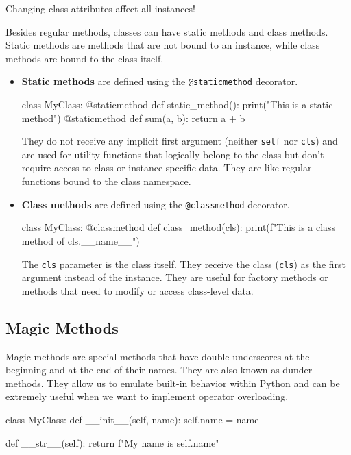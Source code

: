 \begin{warningblock}
    Changing class attributes affect all instances!
\end{warningblock}

Besides regular methods, classes can have static methods and class methods. Static methods are methods that are not bound to an instance, while class methods are bound to the class itself.
\begin{itemize}
    \item \textbf{Static methods} are defined using the \texttt{@staticmethod} decorator.
    \begin{codeblock}[language=Python]
class MyClass:
    @staticmethod
    def static_method():
        print("This is a static method")
    @staticmethod   
    def sum(a, b):
        return a + b
    \end{codeblock}
    They do not receive any implicit first argument (neither \texttt{self} nor \texttt{cls}) and are used for utility
    functions that logically belong to the class but don't require access to class or instance-specific data. They are like regular functions 
    bound to the class namespace.
    \item \textbf{Class methods} are defined using the \texttt{@classmethod} decorator.
    \begin{codeblock}[language=Python]
class MyClass:
    @classmethod
    def class_method(cls):
        print(f"This is a class method of {cls.\_\_name\_\_}")

    \end{codeblock}
    The \texttt{cls} parameter is the class itself. They receive the class (\texttt{cls}) as the first argument 
    instead of the instance. They are useful for factory methods or methods that need to modify
    or access class-level data. 
\end{itemize}

\subsection*{Magic Methods}

Magic methods are special methods that have double underscores at the beginning and at the end of their names. They are also known as dunder methods. They allow us to emulate built-in behavior within Python and can be extremely useful when we want to implement operator overloading.

\begin{codeblock}[language=Python]
class MyClass:
    def __init__(self, name):
        self.name = name

    def __str__(self):
        return f"My name is {self.name}"
\end{codeblock}

